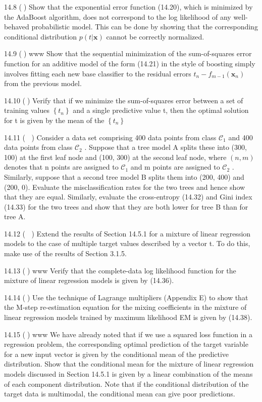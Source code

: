 \documentclass[
  10
]{article}
\begin{document}
14.8 () Show that the exponential error function (14.20), which is
minimized by the AdaBoost algorithm, does not correspond to the log
likelihood of any well-behaved probabilistic model. This can be done by
showing that the corresponding conditional distribution
\(p ( t | \mathbf { x } )\) cannot be correctly normalized.

14.9 () www Show that the sequential minimization of the sum-of-squares
error function for an additive model of the form (14.21) in the style of
boosting simply involves fitting each new base classifier to the
residual errors \(t _ { n } - f _ { m - 1 } ( \mathbf { x } _ { n } )\)
from the previous model.

14.10 () Verify that if we minimize the sum-of-squares error between a
set of training values \(\left\{ t _ { n } \right\}\) and a single
predictive value t, then the optimal solution for t is given by the mean
of the \(\left\{ t _ { n } \right\}\)

14.11 ( ) Consider a data set comprising 400 data points from class
\(\mathcal { C } _ { 1 }\) and 400 data points from class
\(\mathcal { C } _ { 2 }\) . Suppose that a tree model A splits these
into (300, 100) at the first leaf node and (100, 300) at the second leaf
node, where \(( n , m )\) denotes that n points are assigned to
\(\mathcal { C } _ { 1 }\) and m points are assigned to
\(\mathcal { C } _ { 2 }\) . Similarly, suppose that a second tree model
B splits them into (200, 400) and (200, 0). Evaluate the
misclassification rates for the two trees and hence show that they are
equal. Similarly, evaluate the cross-entropy (14.32) and Gini index
(14.33) for the two trees and show that they are both lower for tree B
than for tree A.

14.12 ( ) Extend the results of Section 14.5.1 for a mixture of linear
regression models to the case of multiple target values described by a
vector t. To do this, make use of the results of Section 3.1.5.

14.13 () www Verify that the complete-data log likelihood function for
the mixture of linear regression models is given by (14.36).

14.14 () Use the technique of Lagrange multipliers (Appendix E) to show
that the M-step re-estimation equation for the mixing coefficients in
the mixture of linear regression models trained by maximum likelihood EM
is given by (14.38).

14.15 () www We have already noted that if we use a squared loss
function in a regression problem, the corresponding optimal prediction
of the target variable for a new input vector is given by the
conditional mean of the predictive distribution. Show that the
conditional mean for the mixture of linear regression models discussed
in Section 14.5.1 is given by a linear combination of the means of each
component distribution. Note that if the conditional distribution of the
target data is multimodal, the conditional mean can give poor
predictions.
\end{document}
